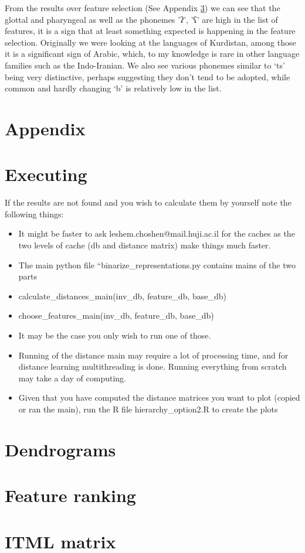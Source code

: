 \documentclass[letterpaper, 11pt]{article}
\begin{document}
From the results over feature selection (See Appendix \ref{ap:features}) we can see that the glottal and pharyngeal as well as the phonemes 'ʔ', 'ʕ' are high in the list of features, it is a sign that at least something expected is happening in the feature selection. Originally we were looking at the languages of Kurdistan, among those it is a significant sign of Arabic, which, to my knowledge is rare in other language families such as the Indo-Iranian. We also see various phonemes similar to ‘ts’ being very distinctive, perhaps suggesting they don’t tend to be adopted, while common and hardly changing ‘b’ is relatively low in the list.

\appendix
\section*{Appendix}
\section{Executing}
If the results are not found and you wish to calculate them by yourself note the following things:
\begin{itemize}
	\item It might be faster to ask leshem.choshen@mail.huji.ac.il for the caches as the two levels of cache (db and distance matrix) make things much faster.
	\item  The main python file “binarize\_representations.py contains mains of the two parts
	\item calculate\_distances\_main(inv\_db, feature\_db, base\_db)
	\item choose\_features\_main(inv\_db, feature\_db, base\_db)
	\item  It may be the case you only wish to run one of those.
	\item Running of the distance main may require a lot of processing time, and for distance learning multithreading is done. Running everything from scratch may take a day of computing.
	\item Given that you have computed the distance matrices you want to plot (copied or ran the main), run the R file hierarchy\_option2.R to create the plots
\end{itemize}

\section{Dendrograms}\label{ap:dendrograms}

\section{Feature ranking}\label{ap:features}

\section{ITML matrix}\label{ap:itml}



\end{document}
